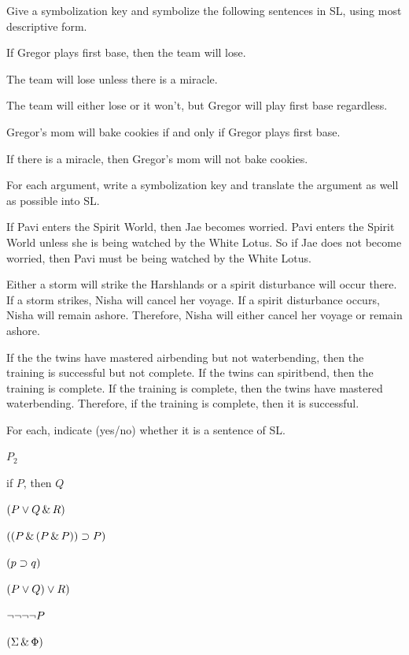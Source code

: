 \solutions
\problempart
\label{pr.gregorbaseball}
Give a symbolization key and symbolize the following sentences in SL, using most descriptive form.
\begin{earg}
\item If Gregor plays first base, then the team will lose.
\item The team will lose unless there is a miracle.
\item The team will either lose or it won't, but Gregor will play first base regardless.
\item Gregor's mom will bake cookies if and only if Gregor plays first base.
\item If there is a miracle, then Gregor's mom will not bake cookies.
\end{earg}


\problempart
\label{pr.choresSL}
For each argument, write a symbolization key and translate the argument as well as possible into SL.
\begin{earg}
\item If Pavi enters the Spirit World, then Jae becomes worried. Pavi enters the Spirit World unless she is being watched by the White Lotus. So if Jae does not become worried, then Pavi must be being watched by the White Lotus.
\item Either a storm will strike the Harshlands or a spirit disturbance will occur there. If a storm strikes, Nisha will cancel her voyage. If a spirit disturbance occurs, Nisha will remain ashore. Therefore, Nisha will either cancel her voyage or remain ashore.
\item If the the twins have mastered airbending but not waterbending, then the training is successful but not complete. If the twins can spiritbend, then the training is complete. If the training is complete, then the twins have mastered waterbending. Therefore, if the training is complete, then it is successful.
\end{earg}



\problempart
\label{HW2.A}
For each, indicate (yes/no) whether it is a sentence of SL.
\begin{earg}
		\item $P_{2}$
		\item if $P$, then $Q$
		\item $(P \vee Q \,\&\, R)$
		\item $((P \,\&\, (P \,\&\, P)) \supset P)$
		\item $(p \supset q)$
		\item $(P \vee Q) \vee R)$
		\item $\neg \neg \neg \neg P$
		\item $(\Sigma \,\&\, \Phi)$
	\end{earg}

